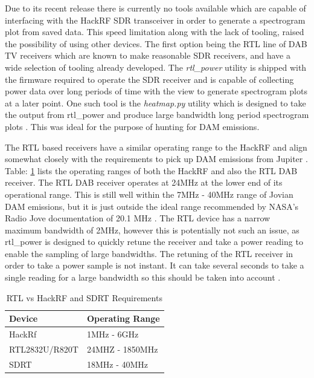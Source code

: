 \documentclass[runningheads,a4paper]{llncs}
\begin{document}
Due to its recent release there is currently no tools available which are capable of interfacing with the HackRF \gls{SDR} transceiver in order to generate a spectrogram plot from saved data. This speed limitation along with the lack of tooling, raised the possibility of using other devices. The first option being the RTL line of DAB TV receivers which are known to make reasonable \gls{SDR} receivers, and have a wide selection of tooling already developed. The \textit{rtl\_power} utility is shipped with the firmware required to operate the \gls{SDR} receiver and is capable of collecting power data over long periods of time with the view to generate spectrogram plots at a later point. One such tool is the \textit{heatmap.py} utility which is designed to take the output from rtl\_power and produce large bandwidth long period spectrogram plots \citep{keen-15}. This was ideal for the purpose of hunting for \gls{DAM} emissions.

The RTL based receivers have a similar operating range to the HackRF and align somewhat closely with the requirements to pick up \gls{DAM} emissions from Jupiter \citep{hamradioscience-12}. Table: \ref{tab:rtl_vs_hackrf} lists the operating ranges of both the HackRF and also the RTL DAB receiver. The RTL DAB receiver operates at 24MHz at the lower end of its operational range. This is still well within the 7MHz - 40MHz range of Jovian \gls{DAM} emissions, but it is just outside the ideal range recommended by NASA's Radio Jove documentation of 20.1 MHz \citep{nasa12}. The RTL device has a narrow maximum bandwidth of 2MHz, however this is potentially not such an issue, as rtl\_power is designed to quickly retune the receiver and take a power reading to enable the sampling of large bandwidths. The retuning of the RTL receiver in order to take a power sample is not instant. It can take several seconds to take a single reading for a large bandwidth so this should be taken into account \citep{keen-15}.

%
\begin{table}
	\centering
	\begin{tabular}{p{4cm} l}
		\toprule
		Device & Operating Range\\ \midrule
		HackRf & 1MHz - 6GHz \\
		RTL2832U/R820T & 24MHZ - 1850MHz \\
		SDRT & 18MHz - 40MHz \\
		\bottomrule
	\end{tabular}
	\caption{RTL vs HackRF and SDRT Requirements}
	\label{tab:rtl_vs_hackrf}
\end{table}
%
\end{document}
